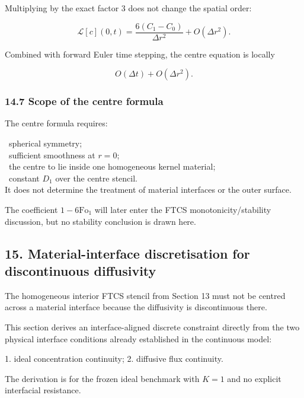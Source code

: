 \documentclass[11pt,a4paper]{article}
\begin{document}
Multiplying by the exact factor $3$ does not change the spatial order:

\begin{equation}
\mathcal L[c](0,t)
=
\frac{
6(C_1-C_0)
}{
\Delta r^2
}
+
O(\Delta r^2).
\tag{TRISO-DIS-232}
\label{eq:triso-dis-232}
\end{equation}

Combined with forward Euler time stepping, the centre equation is locally

\begin{equation}
\boxed{
O(\Delta t)+O(\Delta r^2).
}
\tag{TRISO-DIS-233}
\label{eq:triso-dis-233}
\end{equation}

\subsubsection*{14.7 Scope of the centre formula}

The centre formula requires:

\noindent\textbullet\ spherical symmetry;\\
\noindent\textbullet\ sufficient smoothness at $r=0$;\\
\noindent\textbullet\ the centre to lie inside one homogeneous kernel material;\\
\noindent\textbullet\ constant $D_1$ over the centre stencil.\\

It does not determine the treatment of material interfaces or the outer surface.

The coefficient $1-6\mathrm{Fo}_1$ will later enter the FTCS monotonicity/stability discussion, but no stability conclusion is drawn here.

\subsection*{15. Material-interface discretisation for discontinuous diffusivity}

The homogeneous interior FTCS stencil from Section 13 must not be centred across a material interface because the diffusivity is discontinuous there.

This section derives an interface-aligned discrete constraint directly from the two physical interface conditions already established in the continuous model:

1. ideal concentration continuity;
2. diffusive flux continuity.

The derivation is for the frozen ideal benchmark with $K=1$ and no explicit interfacial resistance.
\end{document}
